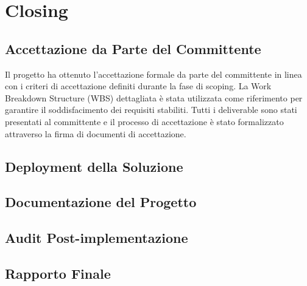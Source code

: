 \chapter{Closing}

\section{Accettazione da Parte del Committente}
Il progetto ha ottenuto l'accettazione formale da parte del committente in linea con i criteri di accettazione definiti durante la fase di scoping. La Work Breakdown Structure (WBS) dettagliata è stata utilizzata come riferimento per garantire il soddisfacimento dei requisiti stabiliti. Tutti i deliverable sono stati presentati al committente e il processo di accettazione è stato formalizzato attraverso la firma di documenti di accettazione.

\section{Deployment della Soluzione}

\section{Documentazione del Progetto}

\section{Audit Post-implementazione}

\section{Rapporto Finale}
